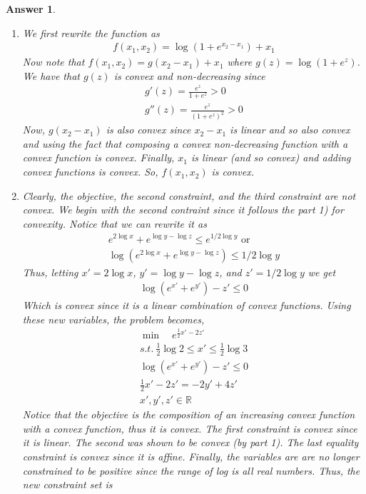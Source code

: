 \documentclass[12pt]{article}
\theoremstyle{colon}
\newtheorem*{answer}{Answer}
\begin{document}
\begin{answer}
  \leavevmode
  \begin{enumerate}[label=\arabic*)]
    \item We first rewrite the function as
      \begin{gather*}
        f(x_1, x_2) = \log (1 + e^{x_2 - x_1}) + x_1
      \end{gather*}
      Now note that $f(x_1, x_2) = g(x_2 - x_1) + x_1$ where $g(z) = \log(1 + e^z)$. We have that $g(z)$ is convex and non-decreasing since
      \begin{gather*}
        g'(z) = \frac{e^z}{1+e^z} > 0 \\
        g''(z) = \frac{e^z}{(1+e^z)^2} > 0
      \end{gather*}
      Now, $g(x_2 - x_1)$ is also convex since $x_2 - x_1$ is linear and so also convex and using the fact that composing a convex non-decreasing function with a convex function is convex. Finally, $x_1$ is linear (and so convex) and adding convex functions is convex. So, $f(x_1, x_2)$ is convex.
    \item Clearly, the objective, the second constraint, and the third constraint are not convex. We begin with the second contraint since it follows the part 1) for convexity. Notice that we can rewrite it as
      \begin{gather*}
        e^{2 \log x} + e^{\log y - \log z} \leq e^{1/2 \log y} \text{ or } \\
        \log \left( e^{2 \log x} + e^{\log y - \log z} \right) \leq 1/2 \log y
      \end{gather*}
      Thus, letting $x' = 2 \log x$, $y' = \log y - \log z$, and $z'  = 1/2 \log y$ we get
      \begin{gather*}
        \log \left( e^{x'} + e^{y'} \right) - z' \leq 0
      \end{gather*}
      Which is convex since it is a linear combination of convex functions. Using these new variables, the problem becomes,
      \begin{gather*}
        \min \quad e^{\frac{1}{2} x' - 2 z'} \\
        s.t. \ \frac{1}{2} \log 2 \leq x' \leq \frac{1}{2} \log 3 \\
        \log \left( e^{x'} + e^{y'} \right) - z' \leq 0 \\
        \frac{1}{2} x' - 2 z' = -2 y' + 4 z' \\
        x', y', z' \in \mathbb{R}
      \end{gather*}
      Notice that the objective is the composition of an increasing convex function with a convex function, thus it is convex. The first constraint is convex since it is linear. The second was shown to be convex (by part 1). The last equality constraint is convex since it is affine. Finally, the variables are are no longer constrained to be positive since the range of log is all real numbers. Thus, the new constraint set is

\end{enumerate}
\end{answer}
\end{document}
